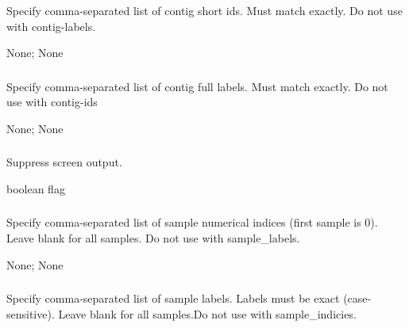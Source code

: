 \documentclass[letterpaper,11pt,english]{sphinxmanual}
\begin{document}
\subsubsection{}
\label{\detokenize{prog_desc:id88}}
 Specify comma-separated list of contig short ids. Must match exactly. Do not use with \textendash{}contig-labels.

 None;  None


\subsubsection{}
\label{\detokenize{prog_desc:id89}}
 Specify comma-separated list of contig full labels. Must match exactly. Do not use with \textendash{}contig-ids

 None;  None


\subsubsection{}
\label{\detokenize{prog_desc:id90}}
 Suppress screen output.

 boolean flag


\subsubsection{}
\label{\detokenize{prog_desc:id91}}
 Specify comma-separated list of sample numerical indices (first sample is 0). Leave blank for all samples. Do not use with \textendash{}sample\_labels.

 None;  None


\subsubsection{}
\label{\detokenize{prog_desc:id92}}
 Specify comma-separated list of sample labels. Labels must be exact (case-sensitive). Leave blank for all samples.Do not use with \textendash{}sample\_indicies.
\end{document}
